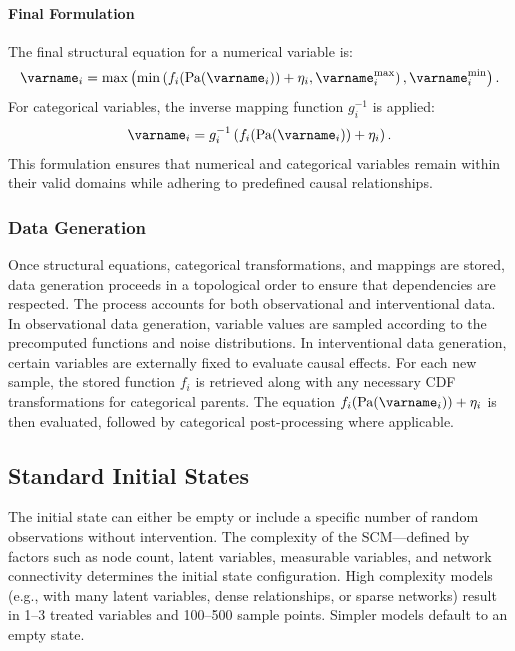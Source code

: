 \documentclass{uai2024} %
\begin{document}
            \paragraph{Final Formulation}
                The final structural equation for a numerical variable is:
                \begin{equation*}
                    \varname_i = \max \left( \min \left( f_i(\text{Pa}(\varname_i)) + \eta_i, \varname_i^{\text{max}} \right), \varname_i^{\text{min}} \right).
                \end{equation*}
                For categorical variables, the inverse mapping function $ g_i^{-1} $ is applied:
                \begin{equation*}
                    \varname_i = g_i^{-1} \left( f_i(\text{Pa}(\varname_i)) + \eta_i \right).
                \end{equation*}
                This formulation ensures that numerical and categorical variables remain within their valid domains while adhering to predefined causal relationships. 


        
        \subsubsection{Data Generation}
            Once structural equations, categorical transformations, and mappings are stored, data generation proceeds in a topological order to ensure that dependencies are respected. 
            The process accounts for both observational and interventional data. 
            In observational data generation, variable values are sampled according to the precomputed functions and noise distributions. 
            In interventional data generation, certain variables are externally fixed to evaluate causal effects. 
            For each new sample, the stored function $ f_i $ is retrieved along with any necessary CDF transformations for categorical parents. 
            The equation \( f_i(\text{Pa}(\varname_i)) + \eta_i \) is then evaluated, followed by categorical post-processing where applicable.



    \subsection{Standard Initial States}
        The initial state can either be empty or include a specific number of random observations without intervention. 
        The complexity of the SCM—defined by factors such as node count, latent variables, measurable variables, and network connectivity determines the initial state configuration. 
        High complexity models (e.g., with many latent variables, dense relationships, or sparse networks) result in 1–3 treated variables and 100–500 sample points. 
        Simpler models default to an empty state.
\end{document}
